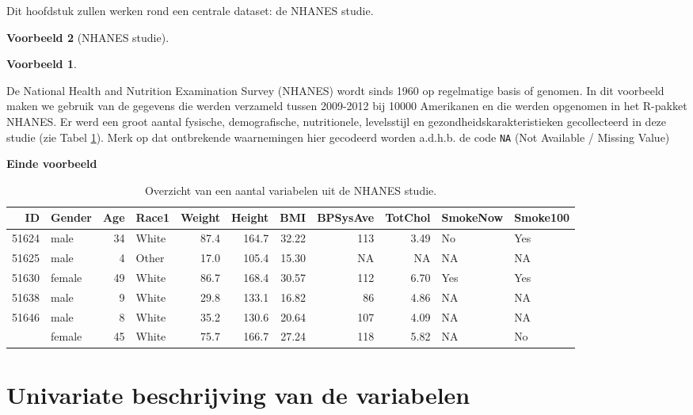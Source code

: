 \documentclass[
  12pt,dutch,coursenotes]{book}
\theoremstyle{definition}
\theoremstyle{definition}
\newtheorem{example}{Voorbeeld}[chapter]
\theoremstyle{definition}
\theoremstyle{remark}
\begin{document}
Dit hoofdstuk zullen werken rond een centrale dataset: de NHANES studie.

\begin{example}[NHANES studie]
\begin{example}

\protect\hypertarget{exm:nhanesEx}{}{\label{exm:nhanesEx} \iffalse (NHANES studie) \fi{} }

\end{example}
\end{example}

De National Health and Nutrition Examination Survey
(NHANES) wordt sinds 1960 op regelmatige basis of genomen. In dit voorbeeld maken we gebruik van de gegevens die werden verzameld tussen 2009-2012 bij 10000 Amerikanen en die werden opgenomen in het R-pakket NHANES. Er werd een groot aantal fysische, demografische, nutritionele, levelsstijl en gezondheidskarakteristieken gecollecteerd in deze studie (zie Tabel \ref{tab:nhanesDatExpl}). Merk op dat ontbrekende waarnemingen hier gecodeerd worden a.d.h.b. de code \texttt{NA} (Not Available / Missing Value)

\textbf{Einde voorbeeld}

\begin{table}[t]

\caption{\label{tab:nhanesDatExpl}Overzicht van een aantal variabelen uit de NHANES studie.}
\centering
\begin{tabular}{rlrlrrrrrll}
\toprule
ID & Gender & Age & Race1 & Weight & Height & BMI & BPSysAve & TotChol & SmokeNow & Smoke100\\
\midrule
51624 & male & 34 & White & 87.4 & 164.7 & 32.22 & 113 & 3.49 & No & Yes\\
51625 & male & 4 & Other & 17.0 & 105.4 & 15.30 & NA & NA & NA & NA\\
51630 & female & 49 & White & 86.7 & 168.4 & 30.57 & 112 & 6.70 & Yes & Yes\\
51638 & male & 9 & White & 29.8 & 133.1 & 16.82 & 86 & 4.86 & NA & NA\\
51646 & male & 8 & White & 35.2 & 130.6 & 20.64 & 107 & 4.09 & NA & NA\\
\addlinespace
51647 & female & 45 & White & 75.7 & 166.7 & 27.24 & 118 & 5.82 & NA & No\\
\bottomrule
\end{tabular}
\end{table}

\hypertarget{sec:univar}{%
\section{Univariate beschrijving van de variabelen}\label{sec:univar}}
\end{document}
